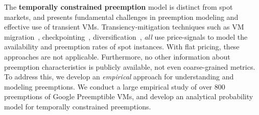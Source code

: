 \begin{comment}
Transiency-mitigation techniques such as VM migration~\cite{spotcheck}, checkpointing~\cite{flint, marathe2014exploiting}, diversification~\cite{exosphere}, \emph{all} use price-signals to model the availability and preemption rates of spot instances. 
However, these pricing-based models are not generalizable to other transient VMs having a flat price (such as Google's or Azure's offerings).
%
%
Moreover, no information about preemption characteristics is publicly available, not even coarse-grained metrics such as MTTFs. 
%
This lack of information and understanding about preemption behavior precludes most failure modeling and transient computing optimizations. 
%



To address this gap, we seek to understand the preemption characteristics of Google's Preemptible VMs, whose distinguishing characteristic is that they have a \emph{maximum lifetime of 24 hours}.
%
This temporal constraint results in new preemption phenomena and impacts application performance and cost in new and interesting ways that have not received attention.
%
We conduct a large empirical study of over 1,500 preemptions of Google Preemptible VMs, and develop an analytical probability model for temporally constrained preemptions.
%
We find that the temporal constraint is a radical departure from pricing-based preemptions, and presents fundamental challenges in preemption modeling and their effective use. %
\end{comment}



The \textbf{temporally constrained preemption} model is distinct from spot markets, and presents fundamental challenges in preemption modeling and effective use of transient VMs. 
%
Transiency-mitigation techniques such as VM migration~\cite{spotcheck}, checkpointing~\cite{flint, marathe2014exploiting}, diversification~\cite{exosphere}, \emph{all} use price-signals to model the availability and preemption rates of spot instances. 
%
With flat pricing, these approaches are not applicable. 
%
Furthermore, no other information about preemption characteristics is publicly available, not even coarse-grained metrics. 
%
To address this, we develop an \emph{empirical} approach for understanding and modeling preemptions. 
%
We conduct a large empirical study of over 800 preemptions of Google Preemptible VMs, and develop an analytical probability model for temporally constrained preemptions. 



